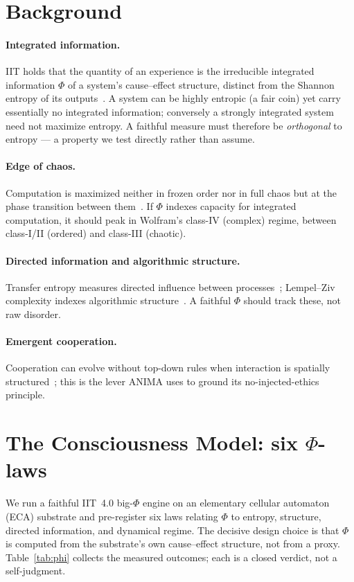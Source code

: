 \documentclass[11pt,a4paper]{article}
\begin{document}
\section{Background}
\paragraph{Integrated information.}
IIT holds that the quantity of an experience is the irreducible integrated
information $\Phi$ of a system's cause--effect structure, distinct from the
Shannon entropy of its outputs~\citep{tononi2016iit,albantakis2023iit4}. A
system can be highly entropic (a fair coin) yet carry essentially no integrated
information; conversely a strongly integrated system need not maximize entropy.
A faithful measure must therefore be \emph{orthogonal} to entropy --- a property
we test directly rather than assume.

\paragraph{Edge of chaos.}
Computation is maximized neither in frozen order nor in full chaos but at the
phase transition between them~\citep{langton1990edge,wolfram2002nks}. If $\Phi$
indexes capacity for integrated computation, it should peak in Wolfram's
class-IV (complex) regime, between class-I/II (ordered) and class-III (chaotic).

\paragraph{Directed information and algorithmic structure.}
Transfer entropy measures directed influence between
processes~\citep{schreiber2000te}; Lempel--Ziv complexity indexes algorithmic
structure~\citep{lempel1976lz}. A faithful $\Phi$ should track these, not raw
disorder. \paragraph{Emergent cooperation.} Cooperation can evolve without
top-down rules when interaction is spatially structured~\citep{nowak2006five};
this is the lever ANIMA uses to ground its no-injected-ethics principle.

\section{The Consciousness Model: six \texorpdfstring{$\Phi$}{Phi}-laws}
\label{sec:phi}
We run a faithful IIT~4.0 big-$\Phi$ engine on an elementary cellular automaton
(ECA) substrate and pre-register six laws relating $\Phi$ to entropy, structure,
directed information, and dynamical regime. The decisive design choice is that
$\Phi$ is computed from the substrate's own cause--effect structure, not from a
proxy. Table~\ref{tab:phi} collects the measured outcomes; each is a closed
verdict, not a self-judgment.
\end{document}
